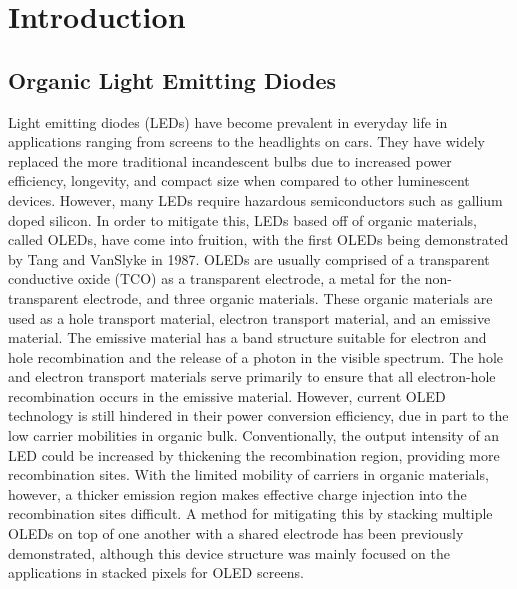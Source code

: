 \documentclass{report}
\begin{document}
\tableofcontents

\chapter{Introduction} \label{intro}

    \section{Organic Light Emitting Diodes}
        Light emitting diodes (LEDs) have become prevalent in everyday life in applications ranging from screens to the headlights on cars. They have widely replaced the more traditional incandescent bulbs due to increased power efficiency, longevity, and compact size when compared to other luminescent devices. However, many LEDs require hazardous semiconductors such as gallium doped silicon\cite{Lim2011}. In order to mitigate this, LEDs based off of organic materials, called OLEDs, have come into fruition, with the first OLEDs being demonstrated by Tang and VanSlyke in 1987. OLEDs are usually comprised of a transparent conductive oxide (TCO) as a transparent electrode, a metal for the non-transparent electrode, and three organic materials. These organic materials are used as a hole transport material, electron transport material, and an emissive material\cite{Shinar2008}. The emissive material has a band structure suitable for electron and hole recombination and the release of a photon in the visible spectrum. The hole and electron transport materials serve primarily to ensure that all electron-hole recombination occurs in the emissive material. However, current OLED technology is still hindered in their power conversion efficiency, due in part to the low carrier mobilities in organic bulk\cite{Shinar2008}. Conventionally, the output intensity of an LED could be increased by thickening the recombination region, providing more recombination sites. With the limited mobility of carriers in organic materials, however, a thicker emission region makes effective charge injection into the recombination sites difficult. A method for mitigating this by stacking multiple OLEDs on top of one another with a shared electrode has been previously demonstrated\cite{Gu1999}, although this device structure was mainly focused on the applications in stacked pixels for OLED screens.
        
\end{document}
